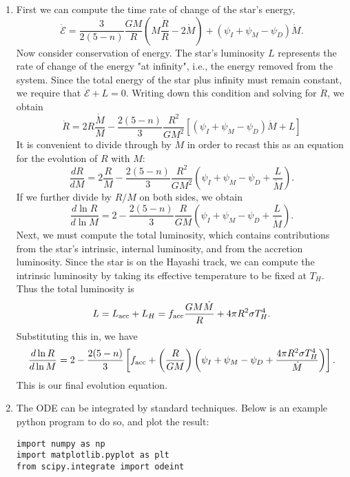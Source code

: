 \begin{enumerate}
\begin{enumerate}
\item First we can compute the time rate of change of the star's energy,
\begin{displaymath}
\dot{\mathcal{E}} = \frac{3}{2(5-n)} \frac{GM}{R} \left(M\frac{\dot{R}}{R} - 2\dot{M}\right) + (\psi_I + \psi_M-\psi_D) \dot{M}.
\end{displaymath}
Now consider conservation of energy. The star's luminosity $L$ represents the rate of change of the energy "at infinity", i.e., the energy removed from the system. Since the total energy of the star plus infinity must remain constant, we require that $\dot{\mathcal{E}} + L = 0$. Writing down this condition and solving for $\dot{R}$, we obtain
\begin{displaymath}
\dot{R} = 2 R \frac{\dot{M}}{M} - \frac{2(5-n)}{3} \frac{R^2}{G M^2}\left[(\psi_I+\psi_M-\psi_D) \dot{M}+L\right]
\end{displaymath}
It is convenient to divide through by $\dot{M}$ in order to recast this as an equation for the evolution of $R$ with $M$:
\begin{displaymath}
\frac{dR}{dM} = 2 \frac{R}{M} - \frac{2(5-n)}{3} \frac{R^2}{G M^2}\left(\psi_I+\psi_M-\psi_D+\frac{L}{\dot{M}}\right).
\end{displaymath}
If we further divide by $R/M$ on both sides, we obtain
\begin{displaymath}
\frac{d\ln R}{d\ln M} = 2 - \frac{2(5-n)}{3} \frac{R}{G M}\left(\psi_I+\psi_M-\psi_D+\frac{L}{\dot{M}}\right).
\end{displaymath}
Next, we must compute the total luminosity, which contains contributions from the star's intrinsic, internal luminosity, and from the accretion luminosity. Since the star is on the Hayashi track, we can compute the intrinsic luminosity by taking its effective temperature to be fixed at $T_H$. Thus the total luminosity is
\begin{displaymath}
L = L_{\rm acc} + L_H = f_{\rm acc} \frac{G M \dot{M}}{R} + 4\pi R^2 \sigma T_H^4.
\end{displaymath}
Substituting this in, we have
\begin{displaymath}
\frac{d\ln R}{d\ln M} = 2 - \frac{2(5-n)}{3} \left[f_{\rm acc} + \left(\frac{R}{G M}\right)\left(\psi_I+\psi_M -\psi_D + \frac{4\pi R^2\sigma T_H^4}{\dot{M}}\right)\right].
\end{displaymath}
This is our final evolution equation.

\item The ODE can be integrated by standard techniques. Below is an example python program to do so, and plot the result:
\begin{verbatim}
import numpy as np
import matplotlib.pyplot as plt
from scipy.integrate import odeint


\end{verbatim}
\end{enumerate}
\end{enumerate}

